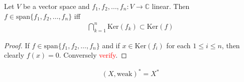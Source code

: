 \begin{lemma}
  Let $V$ be a vector space and $f_1 , f_2 , \ldots , f_n: V \to
  \mathbb{C}$ linear. Then $ f \in \textrm{span} \{ f_1 , f_2 ,
  \ldots , f_n \}$ iff
  \begin{align*}
    \bigcap_{k = 1}^{n}\textrm{Ker}(f_k) \subset \textrm{Ker}(f)
  \end{align*}
\end{lemma}
\begin{proof}
  If $f \in \textrm{span}\{ f_1 , f_2 , \ldots , f_n \}$ and if $x
  \in \textrm{Ker}(f_i)$ for each $1 \le i \le n$, then clearly $f(x) = 0$.
  Conversely \textcolor{red}{verify}.
\end{proof}

\begin{lemma}
  \begin{align*}
    (X, \textrm{weak})^* = X^*
  \end{align*}
\end{lemma}

